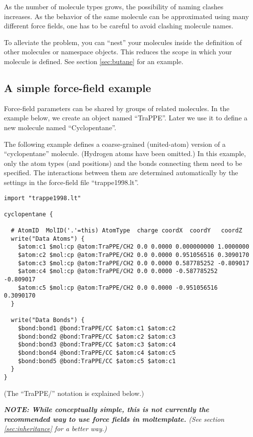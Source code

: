 \documentclass[11pt]{article}
\begin{document}
As the number of molecule types grows, 
the possibility of naming clashes increases. 
As the behavior of the same molecule can be approximated 
using many different force fields, 
one has to be careful to avoid clashing molecule names.

To alleviate the problem, you can ``nest'' your 
molecules inside the definition of other molecules or 
namespace objects.
This reduces the scope in which your molecule is defined.
See section \ref{sec:butane} for an example.


\subsection{A simple force-field example}
\label{sec:force_field_example_trappe}
Force-field parameters can be shared by groups of related molecules.
In the example below, we create an object named ``TraPPE''.
Later we use it to define a new molecule named ``Cyclopentane''.

The following example defines a coarse-grained (united-atom)
version of a ``cyclopentane'' molecule. (Hydrogen atoms have been omitted.)
In this example, only the atom types (and positions) and the bonds 
connecting them need to be specified.  
The interactions between them are determined automatically 
by the settings in the force-field file ``trappe1998.lt''.
\begin{verbatim}
import "trappe1998.lt"

cyclopentane {

  # AtomID  MolID('.'=this) AtomType  charge coordX  coordY   coordZ
  write("Data Atoms") {
    $atom:c1 $mol:cp @atom:TraPPE/CH2 0.0 0.0000 0.000000000 1.0000000
    $atom:c2 $mol:cp @atom:TraPPE/CH2 0.0 0.0000 0.951056516 0.3090170
    $atom:c3 $mol:cp @atom:TraPPE/CH2 0.0 0.0000 0.587785252 -0.809017
    $atom:c4 $mol:cp @atom:TraPPE/CH2 0.0 0.0000 -0.587785252 -0.809017
    $atom:c5 $mol:cp @atom:TraPPE/CH2 0.0 0.0000 -0.951056516 0.3090170
  }

  write("Data Bonds") {
    $bond:bond1 @bond:TraPPE/CC $atom:c1 $atom:c2
    $bond:bond2 @bond:TraPPE/CC $atom:c2 $atom:c3
    $bond:bond3 @bond:TraPPE/CC $atom:c3 $atom:c4
    $bond:bond4 @bond:TraPPE/CC $atom:c4 $atom:c5
    $bond:bond5 @bond:TraPPE/CC $atom:c5 $atom:c1
  }
}
\end{verbatim}
(The ``TraPPE/'' notation is explained below.)

\textit{\textbf{NOTE: While conceptually simple, this is not currently
the recommended way to use force fields in moltemplate.}
(See section \ref{sec:inheritance} for a better way.)}
\end{document}
